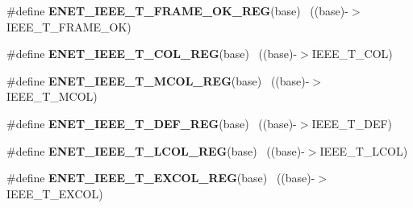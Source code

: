 \begin{DoxyCompactItemize}
\item 
\hypertarget{group___e_n_e_t___register___accessor___macros_ga12768e633cb302c3d076dae961e01276}{}\#define {\bfseries E\+N\+E\+T\+\_\+\+I\+E\+E\+E\+\_\+\+T\+\_\+\+F\+R\+A\+M\+E\+\_\+\+O\+K\+\_\+\+R\+E\+G}(base)                  ~((base)-\/$>$I\+E\+E\+E\+\_\+\+T\+\_\+\+F\+R\+A\+M\+E\+\_\+\+O\+K)\label{group___e_n_e_t___register___accessor___macros_ga12768e633cb302c3d076dae961e01276}

\item 
\hypertarget{group___e_n_e_t___register___accessor___macros_gaff4e440c2cfd4c9be98f7e56881c3fac}{}\#define {\bfseries E\+N\+E\+T\+\_\+\+I\+E\+E\+E\+\_\+\+T\+\_\+C\+O\+L\+\_\+\+R\+E\+G}(base)                          ~((base)-\/$>$I\+E\+E\+E\+\_\+\+T\+\_\+C\+O\+L)\label{group___e_n_e_t___register___accessor___macros_gaff4e440c2cfd4c9be98f7e56881c3fac}

\item 
\hypertarget{group___e_n_e_t___register___accessor___macros_gaa60d9bc8fd340d1c252b6027207d19e9}{}\#define {\bfseries E\+N\+E\+T\+\_\+\+I\+E\+E\+E\+\_\+\+T\+\_\+\+M\+C\+O\+L\+\_\+\+R\+E\+G}(base)                          ~((base)-\/$>$I\+E\+E\+E\+\_\+\+T\+\_\+\+M\+C\+O\+L)\label{group___e_n_e_t___register___accessor___macros_gaa60d9bc8fd340d1c252b6027207d19e9}

\item 
\hypertarget{group___e_n_e_t___register___accessor___macros_ga8c8fb6d017b526081b4d6e9fd7fd4d12}{}\#define {\bfseries E\+N\+E\+T\+\_\+\+I\+E\+E\+E\+\_\+\+T\+\_\+\+D\+E\+F\+\_\+\+R\+E\+G}(base)                            ~((base)-\/$>$I\+E\+E\+E\+\_\+\+T\+\_\+\+D\+E\+F)\label{group___e_n_e_t___register___accessor___macros_ga8c8fb6d017b526081b4d6e9fd7fd4d12}

\item 
\hypertarget{group___e_n_e_t___register___accessor___macros_ga7927d873461691f2f3daad9fa112d89c}{}\#define {\bfseries E\+N\+E\+T\+\_\+\+I\+E\+E\+E\+\_\+\+T\+\_\+\+L\+C\+O\+L\+\_\+\+R\+E\+G}(base)                          ~((base)-\/$>$I\+E\+E\+E\+\_\+\+T\+\_\+\+L\+C\+O\+L)\label{group___e_n_e_t___register___accessor___macros_ga7927d873461691f2f3daad9fa112d89c}

\item 
\hypertarget{group___e_n_e_t___register___accessor___macros_ga9a68712c3138be4800424d4f3367cce9}{}\#define {\bfseries E\+N\+E\+T\+\_\+\+I\+E\+E\+E\+\_\+\+T\+\_\+\+E\+X\+C\+O\+L\+\_\+\+R\+E\+G}(base)                        ~((base)-\/$>$I\+E\+E\+E\+\_\+\+T\+\_\+\+E\+X\+C\+O\+L)\label{group___e_n_e_t___register___accessor___macros_ga9a68712c3138be4800424d4f3367cce9}


\end{DoxyCompactItemize}
